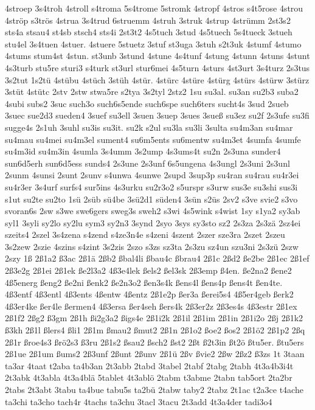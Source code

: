 {4stroep
3s4troh
4stroll
s4troma
5s4trome
5stromk
4stropf
4stros
s4t5rose
4strou
4ströp
s3trös
4strua
3s4trud
6struemm
4struh
3struk
4strup
4strümm
2st3s2
sts4a
stsau4
st4sb
stsch4
sts4i
2st3t2
4s5tuch
3stud
4s5tuech
5s4tueck
3stueh
stu4el
3s4tuen
4stuer.
4stuere
5stuetz
3stuf
st3uga
3stuh
s2t3uk
4stumf
4stumo
4stums
stum4st
4stun.
st3unb
3stund
4stune
4s4tunf
4stung
4stunn
4stuns
4stunt
4s3turb
stu5re
sturi3
s4turk
st3url
stur6mei
4s5turn
4sturs
4st3urt
3s4turz
2s3tus
3s2tut
1s2tü
4stübu
4stüch
3stüh
4stür.
4stürc
4stüre
4stürg
4stürs
4stürw
3stürz
3stüt
4stütc
2stv
2stw
stwa5re
s2tya
3s2tyl
2stz2
1su
su3al.
su3an
su2b3
suba2
4subi
subs2
3suc
such3o
such6s5ende
such6spe
such6ters
sucht4s
3sud
2sueb
3suec
sue2d3
sueden4
3suef
su3ell
3suen
3suep
3sues
3sueß
su3ez
su2f
2s3ufe
su3fi
sugge4s
2s1uh
3suhl
su3is
su3it.
su2k
s2ul
su3la
su3li
3sulta
su4m3an
su4mar
su4mau
su4mei
su4m3el
sument4
su6m5ents
su6mentw
su4m3et
4sumfa
4sumfe
su4m3id
su4m3in
4sumla
3s4umm
3s2ump
4s3ums4t
su2n
2s3una
sunder4
sun6d5erh
sun6d5ess
sunds4
2s3une
2s3unf
6s5ungena
4s3ungl
2s3uni
2s3unl
2sunm
4sunsi
2sunt
2sunv
s4unwa
4sunwe
2supd
3sup3p
su4ran
su4rau
su4r3ei
su4r3er
3s4urf
surfs4
sur5ins
4s3urku
su2r3o2
s5urspr
s3urw
sus3e
su3shi
sus3i
s1ut
su2te
su2to
1sü
2süb
sü4be
3sü2d1
süden4
3sün
s2üs
2sv2
s3ve
svie2
s3vo
svoran6s
2sw
s3we
swe6gers
sweg3s
sweh2
s3wi
4s5wink
s4wist
1sy
s1ya2
sy3ab
syl1
3syli
sy2lo
sy2lu
sym3
sy2n3
3synd
2syo
3sys
sy3sto
sz2
2s3za
2s3zä
2sz4ei
szeits4
2szel
3s4zena
s4zend
s4ze3n4e
s4zeni
4szent
2szer
sze3ra
2szet
2szeu
3s2zew
2szie
4szins
s4zint
3s2zis
2szo
s3zs
sz3ta
2s3zu
sz4un
szu3ni
2s3zü
2szw
2szy
1ß
2ß1a2
ß3ac
2ß1ä
2ßb2
ßbal4li
ßbau4c
ßbrau4
2ß1c
2ßd2
ße2be
2ß1ec
2ß1ef
2ß3e2g
2ß1ei
2ß1ek
ße2l3a2
4ß3e4lek
ßels2
ßel3sk
2ß3emp
ß4en.
ße2na2
ßene2
4ß5energ
ßeng2
ße2ni
ßenk2
ße2n3o2
ßen3s4k
ßens4l
ßens4p
ßens4t
ßen4te.
4ß3entf
4ß3entl
4ß3ents
4ßentw
4ßentz
2ß1e2p
ßer3a
ßerei5s4
4ß5er4geb
ßerk2
4ß3er4ke
ßer4le
ßermen4
4ß3ersa
ßer4seh
ßers4k
2ß3er2z
2ß3es4s
4ß3estr
2ß1ex
2ß1f2
2ßg2
ß3gm
2ß1h
ßi2g3a2
ßigs4e
2ß1i2k
2ß1il
2ß1im
2ß1in
2ß1i2o
2ßj
2ß1k2
ß3kh
2ß1l
ßlers4
ßli1
2ß1m
ßmau2
ßmut2
2ß1n
2ß1o2
ßoe2
ßos2
2ß1ö2
2ß1p2
2ßq
2ß1r
ßroe4s3
ßrö2s3
ß3ru
2ß1s2
ßsau2
ßsch2
ßst2
2ßt
ß2t3in
ßt2ö
ßtu5er.
ßtu5ers
2ß1ue
2ß1um
ßums2
2ß3unf
2ßunt
2ßunv
2ß1ü
2ßv
ßvie2
2ßw
2ßz2
ß3zs
1t
3taan
ta3ar
4taat
t2aba
ta4b3an
2t3abb
2tabd
3tabel
2tabf
2tabg
2tabh
4t3a4b3i4t
2t3abk
4t3abla
4t3a4blä
5tablet
4t3ablö
2tabm
t3abme
2tabn
tab5ort
2ta2br
2tabs
2t3abt
3tabu
ta4bue
tabu5s
ta2bü
2tabw
taby2
2tabz
2t1ac
t2a3ce
t4ache
ta3chi
ta3cho
tach4r
4tachs
ta3chu
3tacl
3tacu
2t3add
4t3a4der
tadi3o4
}
